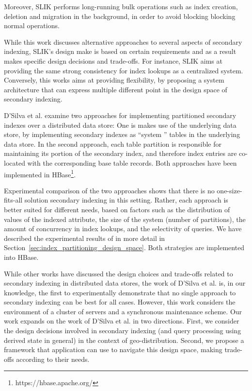 Moreover, SLIK performs long-running bulk operations such as index creation, deletion and migration in the background,
in order to avoid blocking blocking normal operations.

While this work discusses alternative approaches to several aspects of secondary indexing,
SLIK's design make is based on certain requirements and as a result makes specific design decisions and trade-offs.
For instance, SLIK aims at providing the same strong consistency for index lookups as a centralized system.
Conversely, this works aims at providing flexibility, by proposing a system architecture that can express multiple
different point in the design space of secondary indexing.

\bigskip
\noindent
D'Silva et al. \cite{dsilva:tworings} examine two approaches for implementing partitioned secondary indexes over a
distributed data store:
One is makes use of the underlying data store, by implementing secondary indexes as ``system '' tables in the underlying
data store.
In the second approach, each table partition is responsible for maintaining its portion of the secondary index,
and therefore index entries are co-located with the corresponding base table records.
Both approaches have been implemented in HBase\footnote{https://hbase.apache.org/}.

Experimental comparison of the two approaches shows that there is no one-size-fits-all solution secondary indexing in
this setting.
Rather, each approach is better suited for different needs,
based on factors such as the distribution of values of the indexed attribute,
the size of the system (number of partitions), the amount of concurrency in index lookups,
and the selectivity of queries.
We have described the experimental results of \cite{dsilva:tworings} in more detail in Section~\ref{sec:index_partitioning_design_space}.
Both strategies are implemented into HBase.

While other works \cite{kejriwal:slik, tan:diffindex} have discussed the design choices and trade-offs related to secondary
indexing in distributed data stores, the work of D'Silva et al. is, in our knowledge, the first to experimentally
demonstrate that no single approach to secondary indexing can be best for all cases.
However, this work considers the environment of a cluster of servers and a synchronous maintenance scheme.
Our work expands on the work of D'Silva et al. in two directions.
First, we consider the design decisions involved in secondary indexing (and query processing using derived state in general)
in the context of geo-distribution.
Second, we propose a framework that application can use to navigate this design space,
making trade-offs according to their needs.


